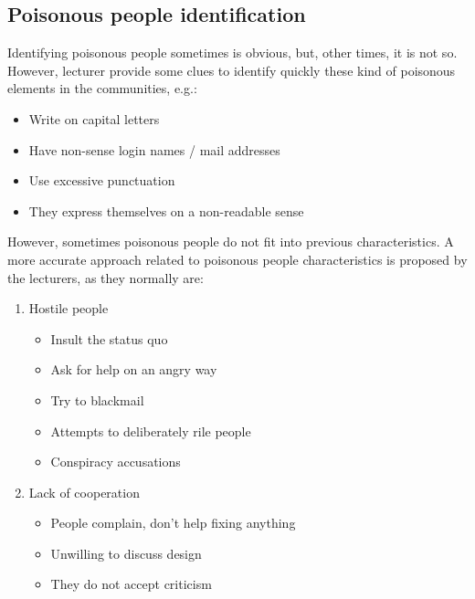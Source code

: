 \documentclass[11pt]{article}
\begin{document}
\subsection{Poisonous people identification}
Identifying poisonous people sometimes is obvious, but, other times, it is not so. However, lecturer provide some clues to identify quickly these kind of poisonous elements in the communities, e.g.:
\begin{itemize}\itemsep0pt
\item{Write on capital letters}
\item{Have non-sense login names / mail addresses}
\item{Use excessive punctuation}
\item{They express themselves on a non-readable sense}
\end{itemize}
However, sometimes poisonous people do not fit into previous characteristics. A more accurate approach related to poisonous people characteristics is proposed by the lecturers, as they normally are:
\begin{enumerate}
\item{Hostile people}
\begin{itemize}\itemsep0pt
\item{Insult the status quo}
\item{Ask for help on an angry way}
\item{Try to blackmail}
\item{Attempts to deliberately rile people}
\item{Conspiracy accusations}
\end{itemize}
\item{Lack of cooperation}
\begin{itemize}\itemsep0pt
\item{People complain, don't help fixing anything}
\item{Unwilling to discuss design}
\item{They do not accept criticism}
\end{itemize}
\end{enumerate}
\end{document}
